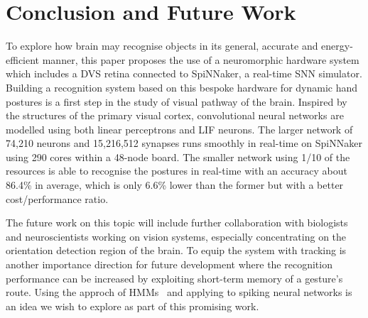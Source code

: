 \documentclass[journal]{journal}
\begin{document}
\section{Conclusion and Future Work}
\label{sec:cfw}

To explore how brain may recognise objects in its general, accurate and energy-efficient manner, this paper proposes the use of a neuromorphic hardware system which includes a DVS retina connected to SpiNNaker, a real-time SNN simulator.
Building a recognition system based on this bespoke hardware for dynamic hand postures is a first step in the study of visual pathway of the brain.
Inspired by the structures of the primary visual cortex, convolutional neural networks are modelled using both linear perceptrons and LIF neurons.
The larger network of 74,210 neurons and 15,216,512 synapses runs smoothly in real-time on SpiNNaker using 290 cores within a 48-node board.
The smaller network using 1/10 of the resources is able to recognise the postures in real-time with an accuracy about 86.4\% in average, which is 
only 6.6\% lower than the former but with a better cost/performance ratio.

The future work on this topic will include further collaboration with biologists and neuroscientists working on vision systems, especially concentrating on the orientation detection region of the brain.
To equip the system with tracking is another importance direction for future development where the recognition performance can be increased by exploiting short-term memory of a gesture's route.
Using the approch of HMMs~\cite{elmezain2009hidden} and applying to spiking neural networks is an idea we wish to explore as part of this promising work.
\end{document}
